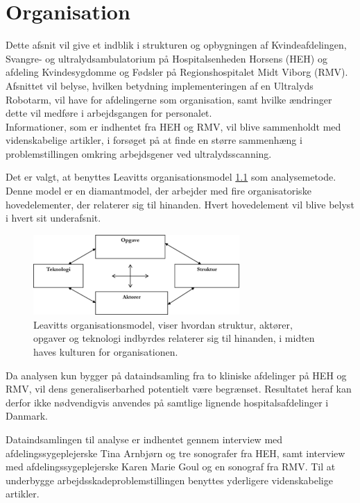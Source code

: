 \chapter{Organisation} \label{Organisation}
Dette afsnit vil give et indblik i strukturen og opbygningen af Kvindeafdelingen, Svangre- og ultralydsambulatorium på Hospitalsenheden Horsens (HEH) og afdeling Kvindesygdomme og Fødsler på Regionshospitalet Midt Viborg (RMV). Afsnittet vil belyse, hvilken betydning implementeringen af en Ultralyds Robotarm, vil have for afdelingerne som organisation, samt hvilke ændringer dette vil medføre i arbejdsgangen for personalet. \\
Informationer, som er indhentet fra HEH og RMV, vil blive sammenholdt med videnskabelige artikler, i forsøget på at finde en større sammenhæng i problemstillingen omkring arbejdsgener ved ultralydsscanning. 

Det er valgt, at benyttes Leavitts organisationsmodel \ref{DiamantModel} som analysemetode. Denne model er en diamantmodel, der arbejder med fire organisatoriske hovedelementer, der relaterer sig til hinanden. Hvert hovedelement vil blive belyst i hvert sit underafsnit. \cite{Leavitt} \cite{diamantmodel} 

\begin{figure}[h!]\centering
	\includegraphics[width = 0.7\textwidth]{Figurer/LeavittModel}
	\caption{Leavitts organisationsmodel, viser hvordan struktur, aktører, opgaver og teknologi indbyrdes relaterer sig til hinanden, i midten haves kulturen for organisationen. \cite{diamantmodel}}
	\label{DiamantModel}
\end{figure}

Da analysen kun bygger på dataindsamling fra to kliniske afdelinger på HEH og RMV, vil dens generaliserbarhed potentielt være begrænset. Resultatet heraf kan derfor ikke nødvendigvis anvendes på samtlige lignende hospitalsafdelinger i Danmark. 

Dataindsamlingen til analyse er indhentet gennem interview med afdelingssygeplejerske Tina Arnbjørn og tre sonografer fra HEH, samt interview med afdelingssygeplejerske Karen Marie Goul og en sonograf fra RMV.
Til at underbygge arbejdsskadeproblemstillingen benyttes yderligere videnskabelige artikler.

